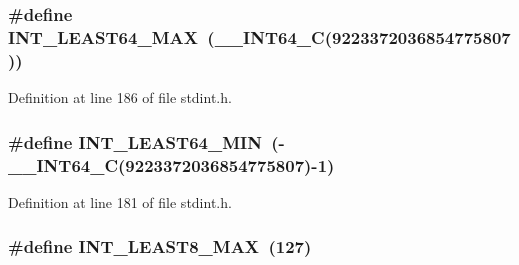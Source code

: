 \subsubsection[{\texorpdfstring{I\+N\+T\+\_\+\+L\+E\+A\+S\+T64\+\_\+\+M\+AX}{INT_LEAST64_MAX}}]{\setlength{\rightskip}{0pt plus 5cm}\#define I\+N\+T\+\_\+\+L\+E\+A\+S\+T64\+\_\+\+M\+AX~({\bf \+\_\+\+\_\+\+I\+N\+T64\+\_\+C}(9223372036854775807))}\hypertarget{win_2_l_a_d_s_p_a__plugins-win_2glibc__includes_2stdint_8h_a35d0f98a2e507fd1be779d49da92724e}{}\label{win_2_l_a_d_s_p_a__plugins-win_2glibc__includes_2stdint_8h_a35d0f98a2e507fd1be779d49da92724e}


Definition at line 186 of file stdint.\+h.

\subsubsection[{\texorpdfstring{I\+N\+T\+\_\+\+L\+E\+A\+S\+T64\+\_\+\+M\+IN}{INT_LEAST64_MIN}}]{\setlength{\rightskip}{0pt plus 5cm}\#define I\+N\+T\+\_\+\+L\+E\+A\+S\+T64\+\_\+\+M\+IN~(-\/{\bf \+\_\+\+\_\+\+I\+N\+T64\+\_\+C}(9223372036854775807)-\/1)}\hypertarget{win_2_l_a_d_s_p_a__plugins-win_2glibc__includes_2stdint_8h_ac12b4f6966b57ad82feb683b284b4060}{}\label{win_2_l_a_d_s_p_a__plugins-win_2glibc__includes_2stdint_8h_ac12b4f6966b57ad82feb683b284b4060}


Definition at line 181 of file stdint.\+h.

\subsubsection[{\texorpdfstring{I\+N\+T\+\_\+\+L\+E\+A\+S\+T8\+\_\+\+M\+AX}{INT_LEAST8_MAX}}]{\setlength{\rightskip}{0pt plus 5cm}\#define I\+N\+T\+\_\+\+L\+E\+A\+S\+T8\+\_\+\+M\+AX~(127)}\hypertarget{win_2_l_a_d_s_p_a__plugins-win_2glibc__includes_2stdint_8h_aa05109908fb2770f632d2b646b9f85bf}{}\label{win_2_l_a_d_s_p_a__plugins-win_2glibc__includes_2stdint_8h_aa05109908fb2770f632d2b646b9f85bf}


